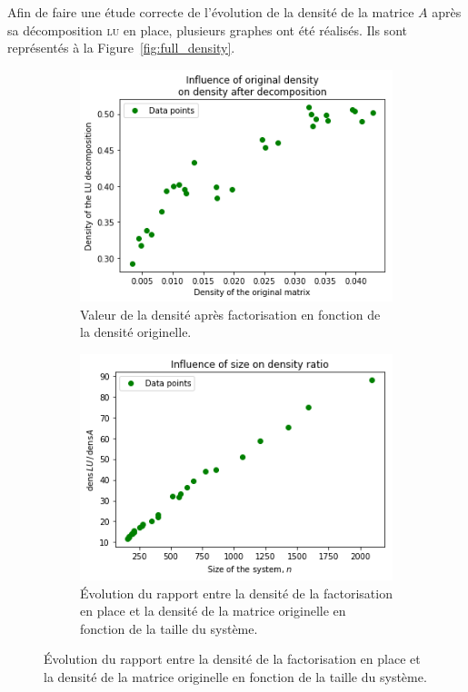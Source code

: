 \documentclass[11pt]{article}
\begin{document}
Afin de faire une étude correcte de l'évolution de la densité de la matrice $A$ après sa décomposition \textsc{lu} en place, plusieurs graphes ont été réalisés.
Ils sont représentés à la Figure~\ref{fig:full_density}.
\begin{figure}[H]
	\centering
	\begin{subfigure}[t]{0.32\textwidth}
		\centering
		\includegraphics[width=\linewidth]{dens_adens_lu.png}
		\caption{Valeur de la densité après factorisation en fonction de la densité originelle.}
		\label{fig:a_dens__lu_dens}
	\end{subfigure}\hfill
	\begin{subfigure}[t]{0.32\textwidth}
		\centering
		\includegraphics[width=\linewidth]{dens_ratio.png}
		\caption{Évolution du rapport entre la densité de la factorisation en place et la densité de la matrice originelle en fonction de la taille du système.}

\end{subfigure}
\end{figure}
\end{document}
